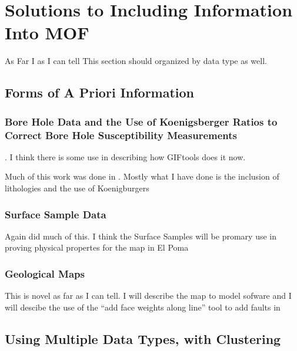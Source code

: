 
\chapter{Solutions to Including Information Into \ac{MOF}}
\label{ch:Introduction}

\begin{epigraph}

\end{epigraph}

As Far I as I can tell This section should organized by data type as well.

\section{Forms of A Priori Information}
\label{sec:Forms of A Priori Information}

\subsection{Bore Hole Data and the Use of Koenigsberger Ratios to Correct Bore Hole Susceptibility Measurements}. I think there is some use in describing how GIFtools does it now.
\label{sec: Bore Hole Data}

Much of this work was done in \cite{williams2008geologically}. Mostly what I have done is the inclusion of lithologies and the use of Koenigburgers
	
\subsection{Surface Sample Data}
\label{sec: Surface Sample Data}

Again \cite{williams2008geologically} did much of this. I think the Surface Samples will be promary use in proving physical propertes for the map in El Poma


\subsection{Geological Maps}
\label{sec: Geological Maps}

This is novel as far as I can tell. I will describe the map to model sofware and I will descibe the use of the ``add face weights along line'' tool to add faults in


\section{Using Multiple Data Types, with Clustering}
\label{sec:Using Multiple Data Types, with Clustering}

